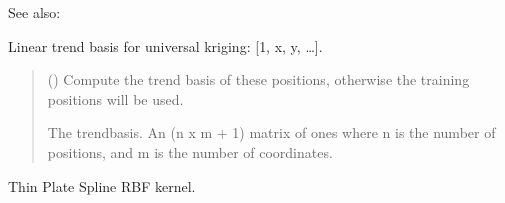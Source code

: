 \documentclass[letterpaper,10pt,english]{sphinxmanual}
\begin{document}
\begin{fulllineitems}
\begin{fulllineitems}
\begin{sphinxseealso}{See also:}
\begin{description}
\end{description}


\end{sphinxseealso}


\end{fulllineitems}


\begin{fulllineitems}
\label{\detokenize{splines:glomar_gridding.spline.ThinPlateSpline.get_trend_basis}}
\pysigstartsignatures
\pysiglinewithargsret
{}
{}
{}
\pysigstopsignatures
\sphinxAtStartPar
Linear trend basis for universal kriging: {[}1, x, y, …{]}.
\begin{quote}\begin{description}
\sphinxAtStartPar
{} () \textendash{} Compute the trend basis of these positions, otherwise the training
positions will be used.

\sphinxAtStartPar
{} \textendash{} The trend\sphinxhyphen{}basis. An (n x m + 1) matrix of ones where n is the
number of positions, and m is the number of coordinates.

\sphinxAtStartPar
{}

\end{description}\end{quote}

\end{fulllineitems}


\begin{fulllineitems}
\label{\detokenize{splines:glomar_gridding.spline.ThinPlateSpline.kernel}}
\pysigstartsignatures
\pysiglinewithargsret
{}
{}
{}
\pysigstopsignatures
\sphinxAtStartPar
Thin Plate Spline RBF kernel.


\end{fulllineitems}
\end{fulllineitems}
\end{document}
